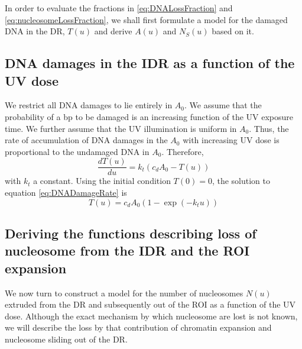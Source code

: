 \documentclass[12pt]{article}
\begin{document}
	In order to evaluate the fractions in \eqref{eq:DNALossFraction} and \eqref{eq:nucleosomeLossFraction}, we shall first formulate a model for the damaged DNA in the DR, $T(u)$ and derive $A(u)$ and $N_S(u)$ based on it.
	
	\subsection{DNA damages in the IDR as a function of the UV dose}\label{subsection:AccumulationOfDNADamagesInTheIDR}
	We restrict all DNA damages to lie entirely in $A_0$. We assume that the probability of a bp to be damaged is an increasing function of the UV exposure time. We further assume that the UV illumination is uniform in $A_0$. Thus, the rate of accumulation of DNA damages in the $A_0$ with increasing UV dose is proportional to the undamaged DNA in $A_0$. Therefore,	
	\begin{equation}\label{eq:DNADamageRate}
	\frac{dT(u)}{du} = k_t(c_dA_0 - T(u))
	\end{equation}	
	with $k_t$ a constant. Using the initial condition $T(0) = 0$, the solution to equation \eqref{eq:DNADamageRate} is
	\begin{equation}\label{eq:DNADamageDR}
	T(u) = c_dA_0(1-\exp(-k_tu))
	\end{equation}
	
	\subsection{Deriving the functions describing loss of nucleosome from the IDR and the ROI expansion}
	We now turn to construct a model for the number of nucleosomes $N(u)$
	extruded from the DR and subsequently out of the ROI as a function of the UV dose. Although the exact mechanism by which nucleosome are lost is not known, we will describe the loss by that contribution of chromatin expansion and nucleosome sliding out of the DR. 
	
	
	
\end{document}
